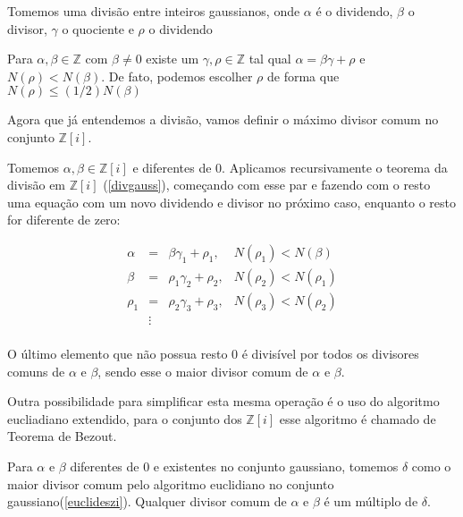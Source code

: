 Tomemos uma divis\~ao entre inteiros gaussianos, onde $\alpha$ \'e o dividendo, $\beta$ o divisor, $\gamma$ o quociente e $\rho$ o dividendo

\begin{Th}  \label{divgauss}

Para $ \alpha, \beta \in \mathbb{Z} $ com $\beta \neq 0$ existe um $\gamma, \rho \in \mathbb{Z}$ tal qual $\alpha = \beta \gamma + \rho$ e $N(\rho) < N(\beta)$. De fato, podemos escolher $\rho$  de forma que $N(\rho) \leq (1/2)N(\beta)$

\end{Th}

Agora que j\'a entendemos a divis\~ao, vamos definir o m\'aximo divisor comum no conjunto $\mathbb{Z}[i]$.

\begin{Th}
\label{euclideszi}

Tomemos $\alpha , \beta \in \mathbb{Z}[i]$ e diferentes de $0$. Aplicamos recursivamente o teorema da divis\~ao em $\mathbb{Z}[i]$ (\ref{divgauss}), come\c{c}ando com esse par e fazendo com o resto uma  equa\c{c}\~ao com um novo dividendo e divisor no pr\'oximo caso, enquanto o resto for diferente de zero:

\[
\begin{array}{lcll}
\alpha & = & \beta \gamma_1 + \rho_1,  & N(\rho_1) < N(\beta)  \\
\beta  & = & \rho_1 \gamma_2 + \rho_2, & N(\rho_2) < N(\rho_1) \\
\rho_1 & = & \rho_2 \gamma_3 + \rho_3, & N(\rho_3) < N(\rho_2) \\
& \vdots &  &\\
\end{array}
\]

O \'ultimo elemento que n\~ao possua resto $0$ \'e divis\'ivel por todos os divisores comuns de $\alpha$ e $\beta$, sendo esse o maior divisor comum de $\alpha$ e $\beta$.

\end{Th}

Outra possibilidade para simplificar esta mesma opera\c{c}\~ao \'e o uso do algoritmo eucliadiano extendido, para o conjunto dos $\mathbb{Z}[i]$ esse algoritmo \'e chamado de Teorema de Bezout.

\begin{Cor} \label{cor}
	Para $\alpha$ e $\beta$ diferentes de $0$ e existentes no conjunto gaussiano, tomemos $\delta$ como o maior divisor comum pelo algoritmo euclidiano no conjunto gaussiano(\ref{euclideszi}). Qualquer divisor comum de $\alpha$ e $\beta$ \'e um m\'ultiplo de $\delta$.
\end{Cor}

